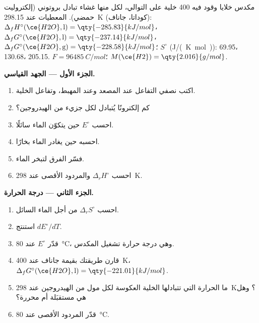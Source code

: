 \begin{problem}
\label{pb:b2:cell-thermodynamics:1}
مكدس خلايا وقود فيه 400 خلية على التوالي، لكل منها غشاء
تبادل بروتوني (إلكتروليت حمضي). المعطيات عند \qty{298.15}{K} (كوداتا، جاناف):
$\Delta_f H^\circ(\ce{H2O}, \text{l}) = \qty{-285.83}{kJ/mol}$، $\Delta_f
G^\circ(\ce{H2O}, \text{l}) = \qty{-237.14}{kJ/mol}$، $\Delta_f G^\circ(\ce{H2O},
\text{g}) = \qty{-228.58}{kJ/mol}$؛ $S^\circ$ (\unit{J/(K.mol)}):  69.95،
 130.68،  205.15. $F = \qty{96485}{C/mol}$؛ $M(\ce{H2}) =
\qty{2.016}{g/mol}$.

\medskip
\noindent\textbf{الجزء الأول --- الجهد القياسي.}
\begin{enumerate}
  \item اكتب نصفي التفاعل عند المصعد وعند المهبط، وتفاعل
        الخلية.
  \item كم إلكترونًا يُتبادل لكل جزيء من الهيدروجين؟
  \item احسب $E^\circ$ حين يتكوّن الماء سائلًا.
  \item احسبه حين يغادر الماء بخارًا.
  \item فسّر الفرق  لتبخر الماء.
  \item احسب $\Delta_r H^\circ$ والمردود الأقصى عند \qty{298}{K}.
\end{enumerate}

\medskip
\noindent\textbf{الجزء الثاني --- درجة الحرارة.}
\begin{enumerate}[resume]
  \item احسب $\Delta_r S^\circ$ من أجل الماء السائل.
  \item استنتج $dE^\circ/dT$.
  \item قدّر $E^\circ$ عند \qty{80}{\degreeCelsius}، وهي درجة حرارة تشغيل
        المكدس.
  \item قارن طريقتك بقيمة جاناف عند \qty{400}{K}، $\Delta_f
        G^\circ(\ce{H2O}, \text{l}) = \qty{-221.01}{kJ/mol}$.
  \item ما الحرارة التي تتبادلها الخلية العكوسة لكل مول من الهيدروجين عند
        \qty{298}{K}؟ وهل هي مستقبَلة أم محررة؟
  \item قدّر المردود الأقصى عند \qty{80}{\degreeCelsius}.
\end{enumerate}


\end{problem}
